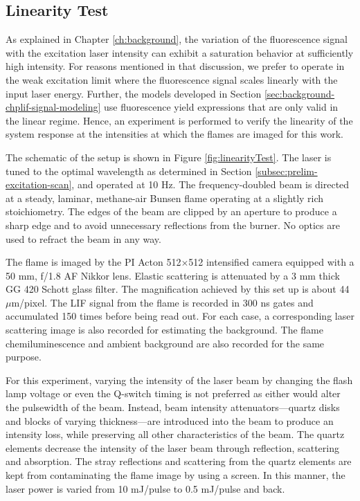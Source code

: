 \subsection{Linearity Test}
\label{subsec:prelim-linearity-test}

As explained in Chapter \ref{ch:background}, the variation of the fluorescence signal with the excitation laser intensity can exhibit a saturation behavior at sufficiently high intensity.
For reasons mentioned in that discussion, we prefer to operate in the weak excitation limit where the fluorescence signal scales linearly with the input laser energy.
Further, the models developed in Section \ref{sec:background-chplif-signal-modeling} use fluorescence yield expressions that are only valid in the linear regime.
Hence, an experiment is performed to verify the linearity of the system response at the intensities at which the flames are imaged for this work.

The schematic of the setup is shown in Figure \ref{fig:linearityTest}.
The laser is tuned to the optimal wavelength as determined in Section \ref{subsec:prelim-excitation-scan}, and operated at 10 Hz.
The frequency-doubled beam is directed at a steady, laminar, methane-air Bunsen flame operating at a slightly rich stoichiometry.
The edges of the beam are clipped by an aperture to produce a sharp edge and to avoid unnecessary reflections from the burner.
No optics are used to refract the beam in any way.



The flame is imaged by the PI Acton 512\(\times\)512 intensified camera equipped with a 50 mm, f/1.8 AF Nikkor lens.
Elastic scattering is attenuated by a 3 mm thick GG 420 Schott glass filter.
The magnification achieved by this set up is about 44 \(\mu\)m/pixel.
The LIF signal from the flame is recorded in 300 ns gates and accumulated 150 times before being read out.
For each case, a corresponding laser scattering image is also recorded for estimating the background.
The flame chemiluminescence and ambient background are also recorded for the same purpose.

For this experiment, varying the intensity of the laser beam by changing the flash lamp voltage or even the Q-switch timing is not preferred as either would alter the pulsewidth of the beam.
Instead, beam intensity attenuators---quartz disks and blocks of varying thickness---are introduced into the beam to produce an intensity loss, while preserving all other characteristics of the beam.
The quartz elements decrease the intensity of the laser beam through reflection, scattering and absorption.
The stray reflections and scattering from the quartz elements are kept from contaminating the flame image by using a screen.
In this manner, the laser power is varied from 10 mJ/pulse to 0.5 mJ/pulse and back.

